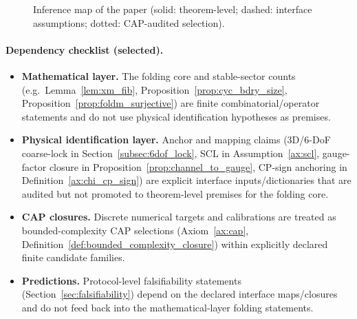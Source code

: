 \begin{figure}[t]
\caption{Inference map of the paper (solid: theorem-level; dashed: interface assumptions; dotted: CAP-audited selection).}
\label{fig:inference_map}
\end{figure}

\paragraph{Dependency checklist (selected).}
\begin{itemize}
\item \textbf{Mathematical layer.} The folding core and stable-sector counts (e.g.\ Lemma~\ref{lem:xm_fib}, Proposition~\ref{prop:cyc_bdry_size}, Proposition~\ref{prop:foldm_surjective}) are finite combinatorial/operator statements and do not use physical identification hypotheses as premises.
\item \textbf{Physical identification layer.} Anchor and mapping claims (3D/6-DoF coarse-lock in Section~\ref{subsec:6dof_lock}, SCL in Assumption~\ref{ax:scl}, gauge-factor closure in Proposition~\ref{prop:channel_to_gauge}, CP-sign anchoring in Definition~\ref{ax:chi_cp_sign}) are explicit interface inputs/dictionaries that are audited but not promoted to theorem-level premises for the folding core.
\item \textbf{CAP closures.} Discrete numerical targets and calibrations are treated as bounded-complexity CAP selections (Axiom~\ref{ax:cap}, Definition~\ref{def:bounded_complexity_closure}) within explicitly declared finite candidate families.
\item \textbf{Predictions.} Protocol-level falsifiability statements (Section~\ref{sec:falsifiability}) depend on the declared interface maps/closures and do not feed back into the mathematical-layer folding statements.
\end{itemize}

